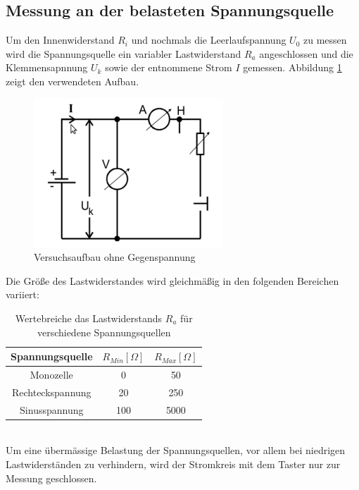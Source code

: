 \documentclass[11pt]{article}
\begin{document}
\subsection{Messung an der belasteten Spannungsquelle}
Um den Innenwiderstand $R_i$ und nochmals die Leerlaufspannung $U_0$ zu messen wird die Spannungsquelle ein variabler Lastwiderstand $R_a$ angeschlossen und die Klemmensapnnung $U_k$ sowie der entnommene Strom $I$ gemessen. Abbildung \ref{Aufbau1} zeigt den verwendeten Aufbau. 
\begin{figure}[htp]
\centering
\includegraphics[scale=1.00]{abb1.png}
\caption{Versuchsaufbau ohne Gegenspannung}
\label{Aufbau1}
\end{figure}
Die Gr\"o\ss e des Lastwiderstandes wird gleichm\"a\ss ig in den folgenden Bereichen variiert:
\begin{table}[h!]
\centering
\begin{tabular}{|c|c|c|}
\hline
Spannungsquelle& $R_{Min} [\Omega]$& $R_{Max} [\Omega]$\\
\hline
Monozelle & 0& 50\\
Rechteckspannung &  20 & 250\\
Sinusspannung&100& 5000\\
\hline
\end{tabular}

\caption{Wertebreiche das Lastwiderstands $R_a$ f\"ur verschiedene Spannungsquellen}
\end{table}\\
Um eine \"uberm\"assige Belastung der Spannungsquellen, vor allem bei niedrigen Lastwiderst\"anden zu verhindern, wird der Stromkreis mit dem Taster nur zur Messung geschlossen.
\end{document}
